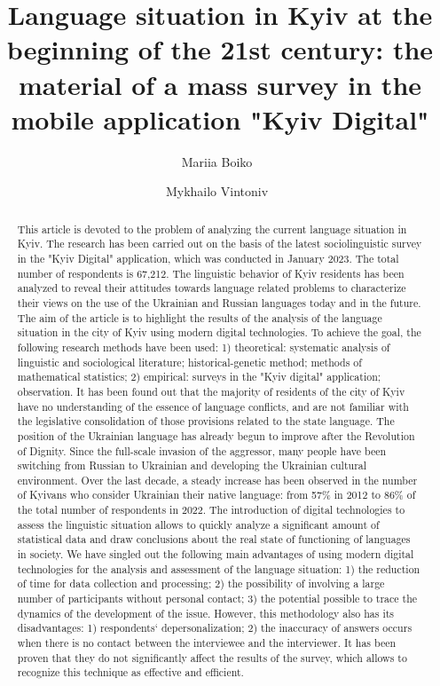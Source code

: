 \documentclass[english]{textolivre}
\title{Language situation in Kyiv at the beginning of the 21st century: the material of a mass survey in the mobile application "Kyiv Digital"}
\author[1]{Mariia Boiko~\orcid{0000-0001-9826-7464}}
\author[1]{Mykhailo Vintoniv~\orcid{0000-0002-3258-8633}}
\affil[1]{Faculty of Ukrainian Philology, Culture and Art Borys Grinchenko Kyiv University, Kyiv, Ukraine.}
\begin{document}
\maketitle

\begin{polyabstract}
 
\begin{english}
\begin{abstract}
This article is devoted to the problem of analyzing the current language situation in Kyiv. The research has been carried out on the basis of the latest sociolinguistic survey in the "Kyiv Digital" application, which was conducted in January 2023. The total number of respondents is 67,212. The linguistic behavior of Kyiv residents has been analyzed to reveal their attitudes towards language related problems to characterize their views on the use of the Ukrainian and Russian languages today and in the future. The aim of the article is to highlight the results of the analysis of the language situation in the city of Kyiv using modern digital technologies. To achieve the goal, the following research methods have been used: 1) theoretical: systematic analysis of linguistic and sociological literature; historical-genetic method; methods of mathematical statistics; 2) empirical: surveys in the "Kyiv digital" application; observation. It has been found out that the majority of residents of the city of Kyiv have no understanding of the essence of language conflicts, and are not familiar with the legislative consolidation of those provisions related to the state language. The position of the Ukrainian language has already begun to improve after the Revolution of Dignity. Since the full-scale invasion of the aggressor, many people have been switching from Russian to Ukrainian and developing the Ukrainian cultural environment. Over the last decade, a steady increase has been observed in the number of Kyivans who consider Ukrainian their native language: from 57\% in 2012 to 86\% of the total number of respondents in 2022. The introduction of digital technologies to assess the linguistic situation allows to quickly analyze a significant amount of statistical data and draw conclusions about the real state of functioning of languages in society. We have singled out the following main advantages of using modern digital technologies for the analysis and assessment of the language situation: 1) the reduction of time for data collection and processing; 2) the possibility of involving a large number of participants without personal contact; 3) the potential possible to trace the dynamics of the development of the issue. However, this methodology also has its disadvantages: 1) respondents` depersonalization; 2) the inaccuracy of answers occurs when there is no contact between the interviewee and the interviewer. It has been proven that they do not significantly affect the results of the survey, which allows to recognize this technique as effective and efficient.


\end{abstract}
\end{english}
\end{polyabstract}
\end{document}
